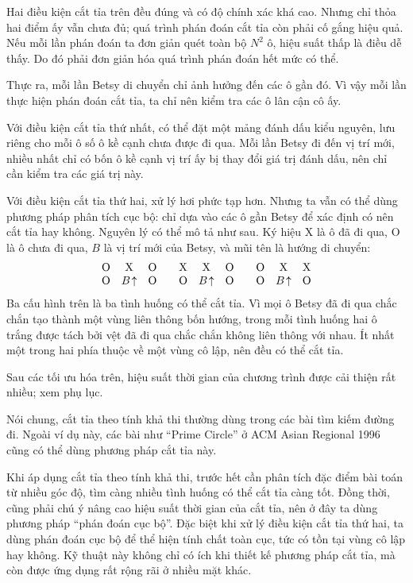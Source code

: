 \documentclass[11pt]{article}
\begin{document}
Hai điều kiện cắt tỉa trên đều đúng và có độ chính xác khá cao. Nhưng chỉ
thỏa hai điểm ấy vẫn chưa đủ; quá trình phán đoán cắt tỉa còn phải cố gắng
hiệu quả. Nếu mỗi lần phán đoán ta đơn giản quét toàn bộ \(N^2\) ô, hiệu suất
thấp là điều dễ thấy. Do đó phải đơn giản hóa quá trình phán đoán hết mức có
thể.

Thực ra, mỗi lần Betsy di chuyển chỉ ảnh hưởng đến các ô gần đó. Vì vậy mỗi
lần thực hiện phán đoán cắt tỉa, ta chỉ nên kiểm tra các ô lân cận cô ấy.

Với điều kiện cắt tỉa thứ nhất, có thể đặt một mảng đánh dấu kiểu nguyên, lưu
riêng cho mỗi ô số ô kề cạnh chưa được đi qua. Mỗi lần Betsy đi đến vị trí
mới, nhiều nhất chỉ có bốn ô kề cạnh vị trí ấy bị thay đổi giá trị đánh dấu,
nên chỉ cần kiểm tra các giá trị này.

Với điều kiện cắt tỉa thứ hai, xử lý hơi phức tạp hơn. Nhưng ta vẫn có thể
dùng phương pháp phân tích cục bộ: chỉ dựa vào các ô gần Betsy để xác định có
nên cắt tỉa hay không. Nguyên lý có thể mô tả như sau. Ký hiệu \(\mathrm{X}\)
là ô đã đi qua, \(\mathrm{O}\) là ô chưa đi qua, \(B\) là vị trí mới của
Betsy, và mũi tên là hướng di chuyển:
\[
\begin{array}{ccc@{\qquad}ccc@{\qquad}ccc}
  \mathrm{O} & \mathrm{X} & \mathrm{O} &
  \mathrm{X} & \mathrm{X} & \mathrm{O} &
  \mathrm{O} & \mathrm{X} & \mathrm{X} \\
  \mathrm{O} & B\!\uparrow & \mathrm{O} &
  \mathrm{O} & B\!\uparrow & \mathrm{O} &
  \mathrm{O} & B\!\uparrow & \mathrm{O}
\end{array}
\]
Ba cấu hình trên là ba tình huống có thể cắt tỉa. Vì mọi ô Betsy đã đi qua
chắc chắn tạo thành một vùng liên thông bốn hướng, trong mỗi tình huống hai ô
trắng được tách bởi vệt đã đi qua chắc chắn không liên thông với nhau. Ít nhất
một trong hai phía thuộc về một vùng cô lập, nên đều có thể cắt tỉa.

Sau các tối ưu hóa trên, hiệu suất thời gian của chương trình được cải thiện
rất nhiều; xem phụ lục.

Nói chung, cắt tỉa theo tính khả thi thường dùng trong các bài tìm kiếm đường
đi. Ngoài ví dụ này, các bài như ``Prime Circle'' ở ACM Asian Regional 1996
cũng có thể dùng phương pháp cắt tỉa này.

Khi áp dụng cắt tỉa theo tính khả thi, trước hết cần phân tích đặc điểm bài
toán từ nhiều góc độ, tìm càng nhiều tình huống có thể cắt tỉa càng tốt. Đồng
thời, cũng phải chú ý nâng cao hiệu suất thời gian của cắt tỉa, nên ở đây ta
dùng phương pháp ``phán đoán cục bộ''. Đặc biệt khi xử lý điều kiện cắt tỉa
thứ hai, ta dùng phán đoán cục bộ để thể hiện tính chất toàn cục, tức có tồn
tại vùng cô lập hay không. Kỹ thuật này không chỉ có ích khi thiết kế phương
pháp cắt tỉa, mà còn được ứng dụng rất rộng rãi ở nhiều mặt khác.
\end{document}
